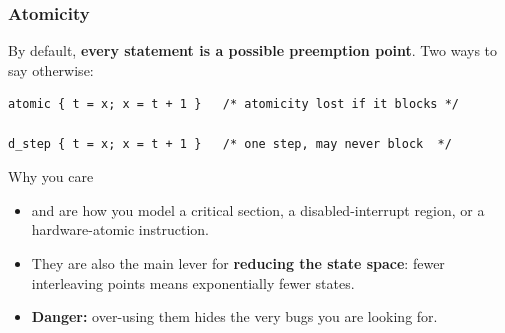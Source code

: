 \begin{frame}[fragile]
  \frametitle{Atomicity} \small

By default, {\bf every statement is a possible preemption point}.
Two ways to say otherwise:

\vspace{0.3cm}

\begin{lstlisting}[language=promela]
atomic { t = x; x = t + 1 }   /* atomicity lost if it blocks */

d_step { t = x; x = t + 1 }   /* one step, may never block  */
\end{lstlisting}

\pause
\vspace{0.3cm}

\begin{block}{Why you care}\small
\begin{itemize}
\item {} and  are how you model a critical section,
      a disabled-interrupt region, or a hardware-atomic instruction.
\item They are also the main lever for {\bf reducing the state space}: fewer
      interleaving points means exponentially fewer states.
\item {\bf Danger:} over-using them hides the very bugs you are looking for.
\end{itemize}
\end{block}

\end{frame}

